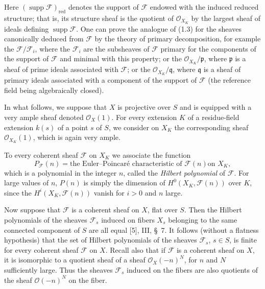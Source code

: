 Here $(\operatorname{supp}\mathcal F)_{\mathrm{red}}$ denotes the support of
$\mathcal F$ endowed with the induced reduced structure; that is, its
structure sheaf is the quotient of $\mathcal O_{X_K}$ by the largest sheaf of
ideals defining $\operatorname{supp}\mathcal F$. One can prove the analogue of
(1.3) for the sheaves canonically deduced from $\mathcal F$ by the theory of
primary decomposition, for example the $\mathcal F/\mathcal F_i$, where the
$\mathcal F_i$ are the subsheaves of $\mathcal F$ primary for the components
of the support of $\mathcal F$ and minimal with this property; or the
$\mathcal O_{X_K}/\mathfrak p$, where $\mathfrak p$ is a sheaf of prime ideals
associated with $\mathcal F$; or the $\mathcal O_{X_K}/\mathfrak q$, where
$\mathfrak q$ is a sheaf of primary ideals associated with a component of the
support of $\mathcal F$ (the reference field being algebraically closed).


In what follows, we suppose that $X$ is projective over $S$ and is equipped
with a very ample sheaf denoted $\mathcal O_X(1)$. For every extension $K$ of
a residue-field extension $k(s)$ of a point $s$ of $S$, we consider on $X_K$
the corresponding sheaf $\mathcal O_{X_K}(1)$, which is again very ample.

To every coherent sheaf $\mathcal F$ on $X_K$ we associate the function
\[
P_{\mathcal F}(n)=\text{the Euler--Poincaré characteristic of $\mathcal F(n)$
on $X_K$},
\]
which is a polynomial in the integer $n$, called the \emph{Hilbert polynomial}
of $\mathcal F$. For large values of $n$, $P(n)$ is simply the dimension of
$H^0(X_K,\mathcal F(n))$ over $K$, since the $H^i(X_K,\mathcal F(n))$ vanish
for $i>0$ and $n$ large.

Now suppose that $\mathcal F$ is a coherent sheaf on $X$, flat over $S$. Then
the Hilbert polynomials of the sheaves $\mathcal F_s$ induced on fibers $X_s$
belonging to the same connected component of $S$ are all equal [5], III,
\S~7. It follows (without a flatness hypothesis) that the set of Hilbert
polynomials of the sheaves $\mathcal F_s$, $s\in S$, is finite for every
coherent sheaf $\mathcal F$ on $X$.
Recall also that if $\mathcal F$ is a coherent sheaf on $X$, it is isomorphic
to a quotient sheaf of a sheaf $\mathcal O_X(-n)^N$, for $n$ and $N$
sufficiently large. Thus the sheaves $\mathcal F_s$ induced on the fibers are
also quotients of the sheaf $\mathcal O(-n)^N$ on the fiber.

